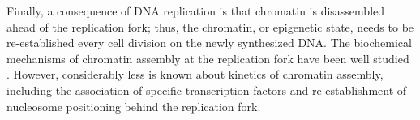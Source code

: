 Finally, a consequence of DNA replication is that chromatin is disassembled ahead of the replication fork; thus, the chromatin, or epigenetic state, needs to be re-established every cell division on the newly synthesized DNA\citep{MacAlpine2013-ds}.   The biochemical mechanisms of chromatin assembly at the replication fork have been well studied \invitro. However, considerably less is known about \invivo kinetics of chromatin assembly, including the association of specific transcription factors and re-establishment of nucleosome positioning behind the replication fork.  











